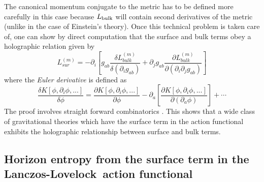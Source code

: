 \documentclass[12pt]{iopart}
\newcommand{\LL}{Lanczos-Lovelock}
\begin{document}
The canonical momentum conjugate to the metric  has to be defined more carefully in this case because $L_{\rm bulk}$ will contain second derivatives of the metric (unlike in the case of Einstein's theory). Once this technical problem is taken care of, one can show by direct computation that the surface and bulk terms obey a holographic relation given by
\begin{equation}
[(D/2) - m]L_{sur}^{(m)} =-\partial_i \left[ g_{ab} \frac{\delta L_{bulk}^{(m)}}{\delta (\partial_i g_{ab})}
  +\partial_jg_{ab} \frac{\partial L_{bulk}^{(m)}}{\partial (\partial_i \partial_jg_{ab})}
  \right] 
\label{result1} 
\end{equation} 
where the \textit{Euler derivative} is defined as 
\begin{equation}
\frac{\delta K[\phi,\partial_i\phi,...]}{\delta\phi}=
\frac{\partial K[\phi,\partial_i\phi,...]}{\partial\phi}-
\partial_a \left[\frac{\partial K[\phi,\partial_i\phi,...]}{\partial(\partial_a\phi)}\right]+\cdots
\end{equation}
The proof involves straight forward combinatorics \cite{ayan}. This shows that a wide class of gravitational theories which have the surface term in the action functional  exhibits the holographic relationship between surface and bulk terms. 

\subsection{Horizon entropy from the surface term in the \LL\ action functional}
\end{document}
